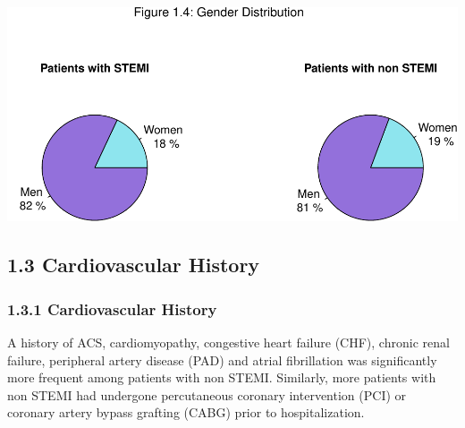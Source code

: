 \documentclass[
]{article}
\begin{document}
~

~

\includegraphics{ACSIS_2024_v1_pdf_files/figure-latex/unnamed-chunk-16-1.pdf}

\pagebreak

\subsection{1.3 Cardiovascular History}\label{cardiovascular-history}

\subsubsection{1.3.1 Cardiovascular
History}\label{cardiovascular-history-1}

A history of ACS, cardiomyopathy, congestive heart failure (CHF),
chronic renal failure, peripheral artery disease (PAD) and atrial
fibrillation was significantly more frequent among patients with non
STEMI. Similarly, more patients with non STEMI had undergone
percutaneous coronary intervention (PCI) or coronary artery bypass
grafting (CABG) prior to hospitalization.

~
\end{document}
